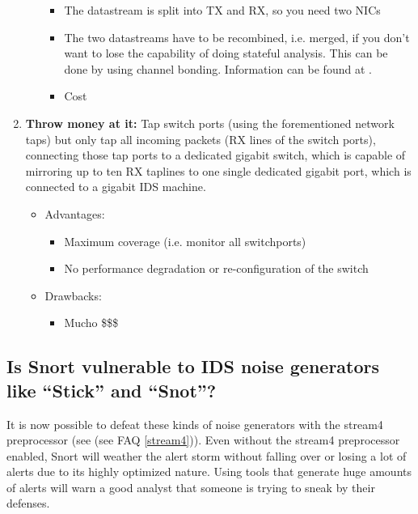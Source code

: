 \documentclass{article}
\newcommand{\myref}[1]{(see FAQ \ref{#1})}
\begin{document}
\begin{enumerate}
\begin{itemize}
		\begin{itemize}
		\item The datastream is split into TX and RX, so you need two NICs
		\item The two datastreams have to be recombined, i.e. merged, if you don't
		want to lose the capability of doing stateful analysis. This can be
		done by using channel bonding. Information can be found at 
		.
		\item Cost
		\end{itemize}
      \end{itemize}
	
\item  {\bf Throw money at it:} Tap switch ports (using the forementioned
    network taps) but only tap all incoming packets (RX lines of the switch
    ports), connecting those tap ports to a dedicated gigabit switch, which is
    capable of mirroring up to ten RX taplines to one single dedicated gigabit
    port, which is connected to a gigabit IDS machine.
    \begin{itemize}
      \item Advantages:
      		\begin{itemize}
        	\item Maximum coverage (i.e. monitor all switchports)
		\item No performance degradation or re-configuration of the switch
		\end{itemize}
      \item Drawbacks:
      		\begin{itemize}
		\item Mucho \$\$\$
		\end{itemize}
    \end{itemize}
\end{enumerate}

\subsection{Is Snort vulnerable to IDS noise generators like ``Stick'' and ``Snot''?}

It is now possible to defeat these kinds of noise generators with
the stream4 preprocessor (see \myref{stream4}).  Even without the stream4 preprocessor 
enabled, Snort will weather the alert storm without falling over 
or losing a lot of alerts due to its highly optimized nature.  
Using tools that generate huge amounts of alerts will warn a good 
analyst that someone is trying to sneak by their defenses.  
\end{document}
